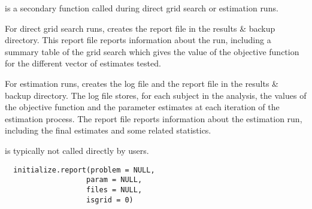 %
\begin{Description}\relax
{} is a secondary function called during direct grid 
search or estimation runs. 

For direct grid search runs,  creates the report file 
in the results \& backup directory. This report file reports information about 
the run, including a summary table of the grid search which gives the value of 
the objective function for the different vector of estimates tested.

For estimation runs,  creates the log file and the 
report file in the results \& backup directory. The log file stores, for each 
subject in the analysis, the values of the objective function and the 
parameter estimates at each iteration of the estimation process. The report 
file reports information about the estimation run, including the final 
estimates and some related statistics.

 is typically not called directly by users.
\end{Description}
%
\begin{Usage}
\begin{verbatim}
  initialize.report(problem = NULL,
                   param = NULL,
                   files = NULL,
                   isgrid = 0)
\end{verbatim}
\end{Usage}
%

